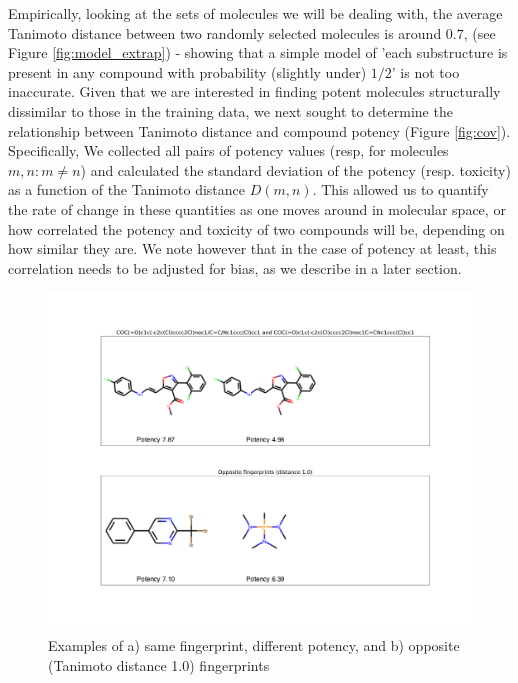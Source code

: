 \documentclass{article}
\begin{document}
\newline
\newline
Empirically, looking at the sets of molecules we will be dealing with, the average Tanimoto distance between two randomly selected molecules is around $0.7$, (see Figure \ref{fig:model_extrap}) - showing that a simple model of 'each substructure is present in any compound with probability (slightly under) $1/2$' is not too inaccurate.
\newline
\newline
Given that we are interested in finding potent molecules structurally dissimilar to those in the training data, we next sought to determine the relationship between Tanimoto distance and compound potency (Figure \ref{fig:cov}). Specifically, We collected all pairs of potency values (resp, for molecules $m, n: m \neq n$) and calculated the standard deviation of the potency (resp. toxicity) as a function of the Tanimoto distance $D(m, n)$. This allowed us to quantify the rate of change in these quantities as one moves around in molecular space, or how correlated the potency and toxicity of two compounds will be, depending on how similar they are. We note however that in the case of potency at least, this correlation needs to be adjusted for bias, as we describe in a later section.

\begin{figure}[h!]
\centering
\includegraphics[width=\textwidth]{fig2_same_and_opposite.png}
\caption{Examples of a) same fingerprint, different potency, and b) opposite (Tanimoto distance 1.0) fingerprints}
\label{fig:examples}
\end{figure}
\end{document}
